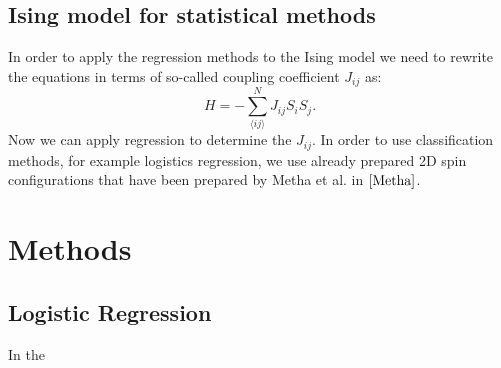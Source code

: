 \documentclass[10pt]{article}
\begin{document}
\subsection{Ising model for statistical methods}
In order to apply the regression methods to the Ising model we need to rewrite the equations in terms of so-called coupling coefficient $J_{ij}$ as:
\begin{equation}
H = -\sum_{\langle ij\rangle}^N J_{ij} S_{i}S_j.
\end{equation}  
Now we can apply regression to determine the $J_{ij}$.
In order to use classification methods, for example logistics regression, we use already prepared 2D spin configurations that have been prepared by Metha et al. in $\cite{Metha}$.

\section{Methods}

\subsection{Logistic Regression}
In the 
\end{document}
